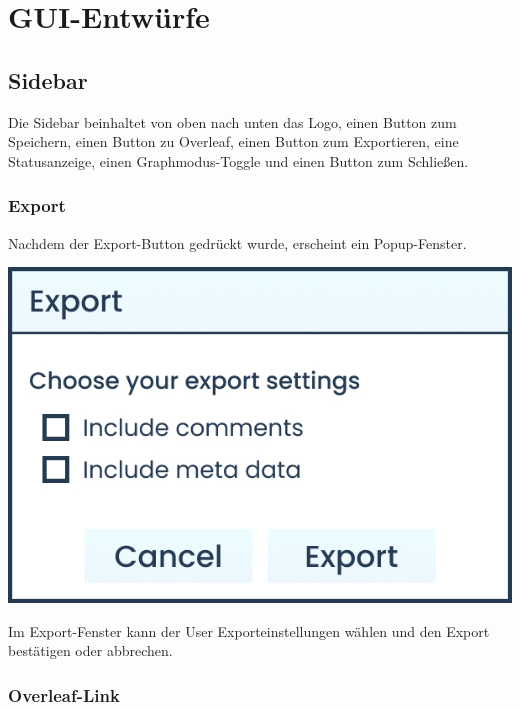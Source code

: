 \clearpage

\section{GUI-Entwürfe}
\label{sec:gui-entwuerfe}

\subsection{Sidebar}
\label{subsec:sidebar}

Die Sidebar beinhaltet von oben nach unten das Logo, einen Button zum Speichern, einen Button zu Overleaf, einen Button
zum Exportieren, eine Statusanzeige, einen Graphmodus-Toggle und einen Button zum Schließen.

\subsubsection{Export}

Nachdem der Export-Button gedrückt wurde, erscheint ein Popup-Fenster.

\begin{center}
  \begin{minipage}{0.5\linewidth}
    \includegraphics[width=\textwidth]{assets/img/Export_Box}
  \end{minipage}
\end{center}

Im Export-Fenster kann der User Exporteinstellungen wählen und den Export bestätigen oder abbrechen.

\subsubsection{Overleaf-Link}

